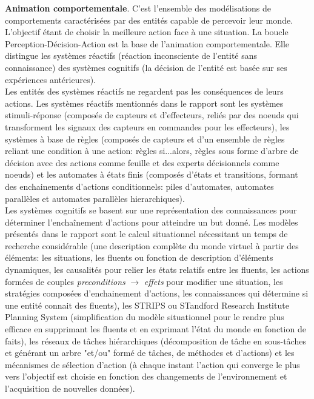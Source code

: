 \documentclass[11pt]{article}
\begin{document}
\textbf{Animation comportementale}. C'est l'ensemble des modélisations de comportements caractérisées par des entités capable de percevoir leur monde. L'objectif étant de choisir la meilleure action face à une situation. La boucle Perception-Décision-Action est la base de l'animation comportementale. Elle distingue les systèmes réactifs (réaction inconsciente de l'entité sans connaissance) des systèmes cognitifs (la décision de l'entité  est basée sur ses expériences antérieures). \\
Les entités des systèmes réactifs ne regardent pas les conséquences de leurs actions.  Les systèmes réactifs mentionnés dans le rapport sont les systèmes stimuli-réponse (composés de capteurs et d'effecteurs, reliés par des noeuds qui transforment les signaux des capteurs en commandes pour les effecteurs), les systèmes à base de règles (composés de capteurs et d'un ensemble de règles reliant une condition à une action: règles si...alors, règles sous forme d'arbre de décision avec des actions comme feuille et des experts décisionnels comme noeuds) et les automates à états finis (composés d'états et transitions, formant des enchainements d'actions conditionnels: piles d'automates, automates parallèles et automates parallèles hierarchiques).\\
Les systèmes cognitifs se basent sur une représentation des connaissances pour déterminer l'enchaînement d'actions pour atteindre un but donné. Les modèles présentés dans le rapport sont le calcul situationnel nécessitant un temps de recherche considérable (une description complète du monde virtuel à partir des éléments: les situations, les fluents ou fonction de description d'éléments dynamiques, les causalités pour relier les états relatifs entre les fluents, les actions formées de couples \textit{preconditions} $\rightarrow$  \textit{effets} pour modifier une situation, les stratégies composées d'enchainement d'actions, les connaissances qui détermine si une entité connait des fluents), les STRIPS ou STandford Research Institute Planning System (simplification du modèle situationnel pour le rendre plus efficace en supprimant les fluents et en exprimant l'état du monde en fonction de faits), les réseaux de tâches hiérarchiques (décomposition de tâche en sous-tâches et générant un arbre "et/ou" formé de tâches, de méthodes et d'actions) et les mécanismes de sélection d'action (à chaque instant l'action qui converge le plus vers l'objectif est choisie en fonction des changements de l'environnement et l'acquisition de nouvelles données).
\end{document}
